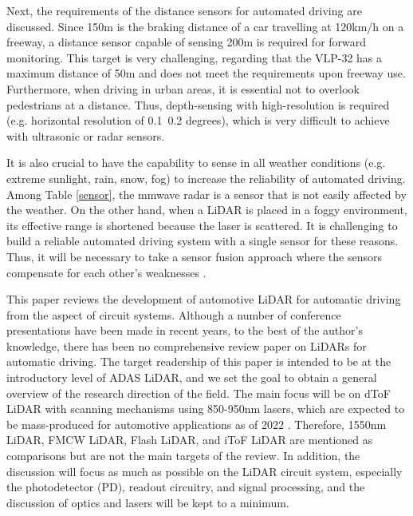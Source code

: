 \documentclass[paper]{ieice}
\begin{document}
Next, the requirements of the distance sensors for automated driving are discussed. Since 150m is the braking distance of a car travelling at 120km/h on a freeway, a distance sensor capable of sensing 200m is required for forward monitoring. This target is very challenging, regarding that the VLP-32\cite {velodyne} has a maximum distance of 50m and does not meet the requirements upon freeway use. Furthermore, when driving in urban areas, it is essential not to overlook pedestrians at a distance. Thus, depth-sensing with high-resolution is required (e.g. horizontal resolution of 0.1~0.2 degrees), which is very difficult to achieve with ultrasonic or radar sensors\cite{mitomo201077,lee2010fully}.

It is also crucial to have the capability to sense in all weather conditions (e.g. extreme sunlight, rain, snow, fog) to increase the reliability of automated driving. Among Table \ref{sensor}, the mmwave radar is a sensor that is not easily affected by the weather. On the other hand, when a LiDAR is placed in a foggy environment, its effective range is shortened because the laser is scattered. 
It is challenging to build a reliable automated driving system with a single sensor for these reasons. Thus, it will be necessary to take a sensor fusion approach where the sensors compensate for each other's weaknesses \cite{yeong2021sensor, loufusion}.

This paper reviews the development of automotive LiDAR for automatic driving from the aspect of circuit systems. Although a number of conference presentations have been made in recent years, to the best of the author's knowledge, there has been no comprehensive review paper on LiDARs for automatic driving.
The target readership of this paper is intended to be at the introductory level of ADAS LiDAR, and we set the goal to obtain a general overview of the research direction of the field. The main focus will be on dToF LiDAR with scanning mechanisms using 850-950nm lasers, which are expected to be mass-produced for automotive applications as of 2022 \cite{niclass2012100, niclass2008128, niclass20130, yoshioka201820, yoshioka201820ch, kondo2020automotive, ta20202d, akita2017imager, ito2013system, liu201960, kumagai2021189x600, ito2020back, seo2021direct, ouster}. 
Therefore, 1550nm LiDAR\cite{chung202119}, FMCW LiDAR\cite{behroozpour201611, poulton2017coherent}, Flash LiDAR\cite{ximenes2018256, padmanabhan20217, lindner2018252}, and iToF LiDAR\cite{kawahito2007cmos, bamji20140, bamji2018impixel, keel2019vga} are mentioned as comparisons but are not the main targets of the review. In addition, the discussion will focus as much as possible on the LiDAR circuit system, especially the photodetector (PD), readout circuitry, and signal processing, and the discussion of optics and lasers will be kept to a minimum.
\end{document}
